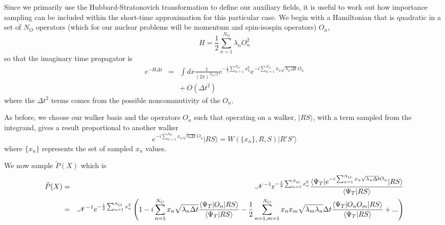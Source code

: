  Since we primarily use the Hubbard-Stratonovich transformation to define
 our auxiliary fields, it is useful to work out how importance sampling
 can be included within the short-time approximation for this particular
 case. We begin with a Hamiltonian that is quadratic in a set of $N_O$ operators
 (which for our nuclear problems will be momentum and spin-isospin operators)
 $O_n$,
 \begin{equation}
 \label{eq.sumofsquares}
 H = \frac{1}{2}\sum_{n=1}^{N_O} \lambda_n O_n^2
 \end{equation}
 so that the imaginary time propagator is
 \begin{eqnarray}
 e^{-H \Delta t} &=&  \int dx \frac{1}{(2\pi)^{N_O/2}}
 e^{-\frac{1}{2}\sum_{n=1}^{N_O} x_n^2}
 e^{-i\sum_{n=1}^{N_O} x_n \sqrt{\lambda_n \Delta t} O_n}
 \nonumber\\
 && + ~ O(\Delta t^2)
 \end{eqnarray}
 where the $\Delta t^2$ terms comes from the possible noncommutivity of the
 $O_n$.
 
 As before, we choose our walker basis and the operators $O_n$ such
 that operating on a walker,
 $|R S\rangle$,
 with a term sampled from the integrand, gives a result
 proportional to another walker
 \begin{equation}
 \label{eq.walkerprop}
 e^{-i \sum_{n=1}^{N_O} x_n\sqrt{\lambda \Delta t} O_n}|RS\rangle =
 W(\{x_n\},R,S) |R'S'\rangle
 \end{equation}
 where $\{x_n\}$ represents the set of sampled $x_n$ values.
 
 We now sample $\tilde P(X)$ which is
 \begin{eqnarray}
 \tilde P(X) &=&
 {\cal N}^{-1}
 e^{-\frac{1}{2} \sum_{n=1}^{N_O} x_n^2}
 \frac{\langle \Psi_T |e^{-i\sum_{n=1}^{N_O}
 		x_n \sqrt{\lambda_n \Delta t} O_n}|R S\rangle}
 {\langle \Psi_T|RS\rangle}
 \nonumber\\
 &=& {\cal N}^{-1}
 e^{-\frac{1}{2} \sum_{n=1}^{N_O} x_n^2}
 \left (1 -i\sum_{n=1}^{N_O} x_n \sqrt{\lambda_n \Delta t}
 \frac{\langle \Psi_T|O_n|R S\rangle}
 {\langle \Psi_T|R S\rangle}
 - \frac{1}{2}\sum_{n=1,m=1}^{N_O}
 x_n x_m\sqrt{\lambda_m \lambda_n} \Delta t
 \frac{\langle \Psi_T|O_nO_m|R S\rangle}
 {\langle \Psi_T|R S\rangle}
 + ... \right )
 \nonumber\\
 \label{eq.hsimp}
 \end{eqnarray}
 
